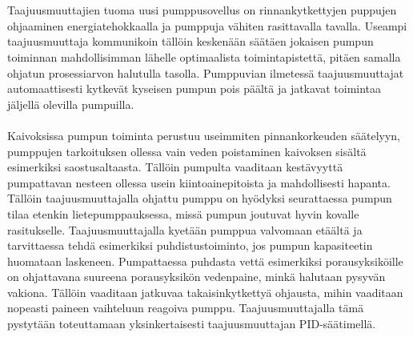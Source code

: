 \documentclass[finnish,12pt,a4paper,pdftex,elec,utf8]{aaltothesis}
\begin{document}
\\\\
Taajuusmuuttajien tuoma uusi pumppusovellus on rinnankytkettyjen puppujen ohjaaminen energiatehokkaalla ja pumppuja vähiten rasittavalla tavalla. Useampi taajuusmuuttaja kommunikoin tällöin keskenään säätäen jokaisen pumpun toiminnan mahdollisimman lähelle optimaalista toimintapistettä, pitäen samalla ohjatun prosessiarvon halutulla tasolla. Pumppuvian ilmetessä taajuusmuuttajat automaattisesti kytkevät kyseisen pumpun pois päältä ja jatkavat toimintaa jäljellä olevilla pumpuilla. 
\\\\
Kaivoksissa pumpun toiminta perustuu useimmiten pinnankorkeuden säätelyyn, pumppujen tarkoituksen ollessa vain veden poistaminen kaivoksen sisältä esimerkiksi saostusaltaasta. Tällöin pumpulta vaaditaan kestävyyttä pumpattavan nesteen ollessa usein kiintoainepitoista ja mahdollisesti hapanta. Tällöin taajuusmuuttajalla ohjattu pumppu on hyödyksi seurattaessa pumpun tilaa etenkin lietepumppauksessa, missä pumpun joutuvat hyvin kovalle rasitukselle. Taajuusmuuttajalla kyetään pumppua valvomaan etäältä ja tarvittaessa tehdä esimerkiksi puhdistustoiminto, jos pumpun kapasiteetin huomataan laskeneen. Pumpattaessa puhdasta vettä esimerkiksi porausyksiköille on ohjattavana suureena porausyksikön vedenpaine, minkä halutaan pysyvän vakiona. Tällöin vaaditaan jatkuvaa takaisinkytkettyä ohjausta, mihin vaaditaan nopeasti paineen vaihteluun reagoiva pumppu. Taajuusmuuttajalla tämä pystytään toteuttamaan yksinkertaisesti taajuusmuuttajan PID-säätimellä.
\end{document}
